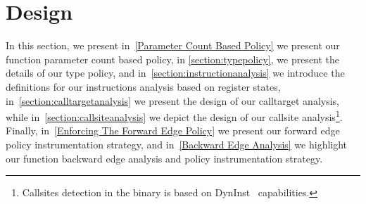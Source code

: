 \section{Design}
\label{chapter:Design}

In this section, we present 
in~\cref{Parameter Count Based Policy} we present our function parameter count based policy,
in \cref{section:typepolicy}, we present the details of our type policy, and 
in~\cref{section:instructionanalysis} we introduce the definitions for our instructions analysis based on register states,  
in~\cref{section:calltargetanalysis} we present the design of our calltarget analysis, while
in~\cref{section:callsiteanalysis} we depict the design of our callsite analysis\footnote{Callsites detection in the binary is based on DynInst~\cite{bernat:dyninst} capabilities.}.
Finally,  
in~\cref{Enforcing The Forward Edge Policy} we present our forward edge policy instrumentation strategy, and 
in~\cref{Backward Edge Analysis} we highlight our function backward edge analysis and policy instrumentation strategy.

